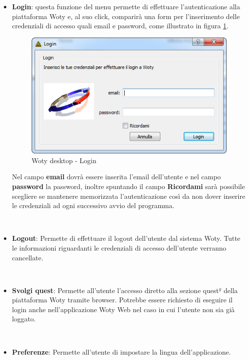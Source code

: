 \begin{itemize}
\item \textbf{Login}:
questa funzione del menu permette di effettuare l'autenticazione alla piattaforma Woty e, al suo click, comparirà una form per l'inserimento delle credenziali di accesso quali email e password, come illustrato in figura \ref{wd-login}.

\begin{center}
\begin{figure}[H]
\centering
\includegraphics[scale=0.7]{images/wotyDesktop/schreenshots/window-login.png}
\caption{Woty desktop - Login}
\label{wd-login}
\end{figure}
\end{center}

Nel campo \textbf{email} dovrà essere inserita l'email dell'utente e nel campo \textbf{password} la password, inoltre spuntando il campo \textbf{Ricordami} sarà possibile scegliere se mantenere memorizzata l'autenticazione così da non dover inserire le credenziali ad ogni successivo avvio del programma.

\ \
\item \textbf{Logout}:
Permette di effettuare il logout dell'utente dal sistema Woty. Tutte le informazioni riguardanti le credenziali di accesso dell'utente verranno cancellate.


\ \
\item \textbf{Svolgi quest}:
Permette all'utente l'accesso diretto alla sezione quest$^g$ della piattaforma Woty tramite browser. Potrebbe essere richiesto di eseguire il login anche nell'applicazione Woty Web nel caso in cui l'utente non sia già loggato.

\ \
\item \textbf{Preferenze}:
Permette all'utente di impostare la lingua dell'applicazione.


\end{itemize}
